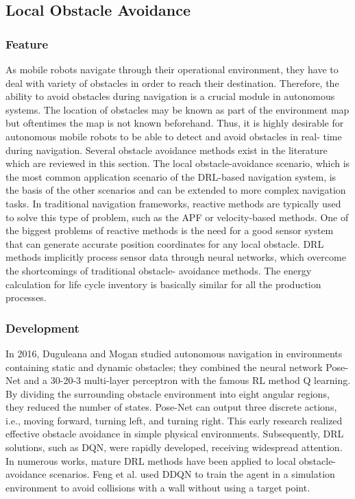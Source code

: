 \subsection{Local Obstacle Avoidance}
\subsubsection{Feature}
As mobile robots navigate through their operational environment, they have to deal with variety of obstacles in order to reach their destination. Therefore, the ability to avoid obstacles during navigation is a crucial module in autonomous systems. The location of obstacles may be known as part of the environment map but oftentimes the map is not known beforehand. Thus, it is highly desirable for autonomous mobile robots to be able to detect and avoid obstacles in real- time during navigation. Several obstacle avoidance methods exist in the literature which are reviewed in this section.
The local obstacle-avoidance scenario, which is the most common application scenario of the DRL-based navigation system, is the basis of the other scenarios and can be extended to more complex navigation tasks. In traditional navigation frameworks, reactive methods
are typically used to solve this type of problem, such as the APF or velocity-based methods. One of the biggest problems of reactive methods is the need for a good sensor system that can generate accurate position coordinates for any local obstacle. DRL methods
implicitly process sensor data through neural networks, which overcome the shortcomings of traditional obstacle- avoidance methods. The energy calculation for life cycle inventory is basically similar for all the production processes. 

\subsubsection{Development}
In 2016, Duguleana and Mogan\cite{duguleana2016} studied autonomous navigation in environments containing static and dynamic obstacles; they combined the neural network Pose-Net and a 30-20-3 multi-layer perceptron with the famous RL method Q learning\cite{watkins1989}. By dividing the surrounding obstacle environment into eight angular regions, they reduced the number of states. Pose-Net can output three discrete actions, i.e., moving forward, turning left, and turning right. This early research realized effective obstacle avoidance in simple physical environments. Subsequently, DRL solutions, such as DQN, were rapidly developed, receiving widespread attention. In numerous works, mature DRL methods have been applied to local obstacle-avoidance scenarios. Feng et al.\cite{feng2019} used DDQN to train the agent in a simulation environment to avoid collisions with a wall without using a target point.

